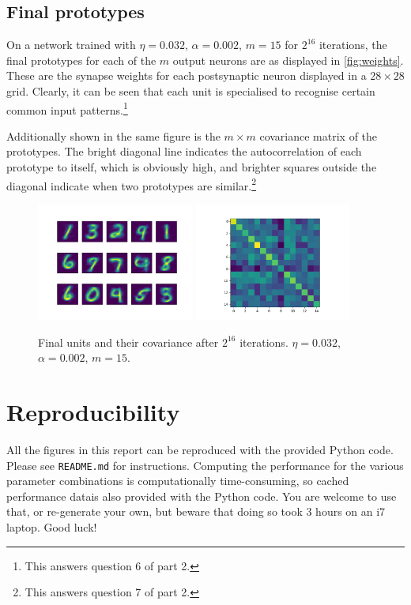 \documentclass[a4paper, 11pt, twocolumn, final]{article} %
\begin{document}
\subsection{Final prototypes} On a network trained with $\eta = 0.032$, $\alpha =
0.002$, $m = 15$ for $2^{16}$ iterations, the final prototypes for each of the
$m$ output neurons are as displayed in \autoref{fig:weights}.  These are the
synapse weights for each postsynaptic neuron displayed in a $28\times28$ grid.
Clearly, it can be seen that each unit is specialised to recognise certain
common input patterns.\footnote{This answers question 6 of part 2.}

Additionally shown in the same figure is the $m\times{}m$ covariance matrix of
the prototypes. The bright diagonal line indicates the autocorrelation of each
prototype to itself, which is obviously high, and brighter squares outside the
diagonal indicate when two prototypes are similar.\footnote{This answers
question 7 of part 2.}

\begin{figure}
  \includegraphics[width=0.46\textwidth]{weights.png}
  \includegraphics[width=0.46\textwidth]{unit_covariance.png}
  \caption{Final units and their covariance after $2^{16}$ iterations.
           $\eta = 0.032$, $\alpha = 0.002$, $m = 15$.}
  \label{fig:weights}
\end{figure}

\section{Reproducibility} All the figures in this report can be reproduced with
the provided Python code.  Please see \texttt{README.md} for instructions.
Computing the performance for the various parameter combinations is
computationally time-consuming, so cached performance datais also provided with
the Python code.  You are welcome to use that, or re-generate your own, but
beware that doing so took 3 hours on an i7 laptop.  Good luck!
\end{document}
